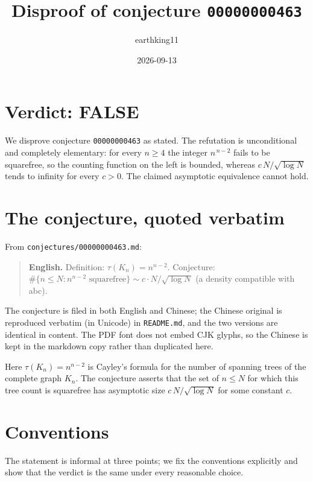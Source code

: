 \documentclass[11pt]{article}
\title{Disproof of conjecture \texttt{00000000463}}
\author{earthking11}
\date{2026-09-13}
\theoremstyle{definition}
\theoremstyle{remark}
\begin{document}
\maketitle

\section*{Verdict: FALSE}

We disprove conjecture \texttt{00000000463} as stated. The refutation is
unconditional and completely elementary: for every $n \ge 4$ the integer
$n^{\,n-2}$ fails to be squarefree, so the counting function on the left is
bounded, whereas $c\,N/\sqrt{\log N}$ tends to infinity for every $c>0$. The
claimed asymptotic equivalence cannot hold.

\section{The conjecture, quoted verbatim}

From \texttt{conjectures/00000000463.md}:

\begin{quote}
\textbf{English.} Definition: $\tau(K_n) = n^{n-2}$. Conjecture:
$\#\{n \le N : n^{n-2} \text{ squarefree}\} \sim c\cdot N/\sqrt{\log N}$
(a density compatible with abc).
\end{quote}

The conjecture is filed in both English and Chinese; the Chinese original is
reproduced verbatim (in Unicode) in \texttt{README.md}, and the two versions are
identical in content. The PDF font does not embed CJK glyphs, so the Chinese is
kept in the markdown copy rather than duplicated here.

Here $\tau(K_n) = n^{n-2}$ is Cayley's formula for the number of spanning trees
of the complete graph $K_n$. The conjecture asserts that the set of $n \le N$
for which this tree count is squarefree has asymptotic size
$c\,N/\sqrt{\log N}$ for some constant $c$.

\section{Conventions}

The statement is informal at three points; we fix the conventions explicitly and
show that the verdict is the same under every reasonable choice.
\end{document}
